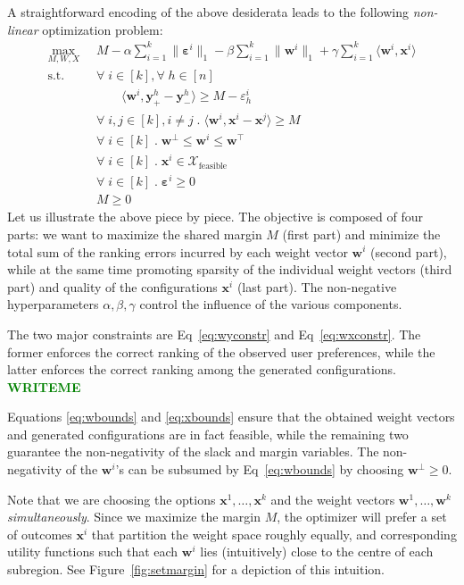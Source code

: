 \documentclass{article}
\renewcommand\[{\begin{equation}}
\renewcommand\]{\end{equation}}
\newcommand{\calvar}[1]{\ensuremath{\mathcal{#1}}}
\newcommand{\calX}{\calvar{X}}
\newcommand{\vecvar}[1]{\ensuremath{\boldsymbol{#1}}}
\newcommand{\vw}{\vecvar{w}}
\newcommand{\vx}{\vecvar{x}}
\newcommand{\vy}{\vecvar{y}}
\newcommand{\veps}{\vecvar{\varepsilon}}
\newcommand{\stefano}[1]{{\bf \textcolor{green}{{\fbox{Stefano:} #1}}}}
\begin{document}
A straightforward encoding of the above desiderata leads to the following {\em
non-linear} optimization problem:
%
{\footnotesize
\begin{align}
    \max_{M, W, X}
        & \;\; M - \alpha \sum_{i=1}^k \| \veps^{i} \|_1 - \beta \sum_{i=1}^k \| \vw^{i} \|_1 + \gamma \sum_{i=1}^k \langle \vw^{i}, \vx^{i} \rangle
        \nonumber
    \\
    \text{s.t.}
        & \;\; \forall \; i \in [k], \forall \; h \in [n] \nonumber
    \\
        & \;\; \qquad \langle \vw^{i}, \vy^{h}_+ - \vy^{h}_- \rangle \ge M - \varepsilon^{i}_h \label{eq:wyconstr}
    \\
        & \;\; \forall \; i, j \in [k], i \neq j \;.\; \langle \vw^{i}, \vx^{i} - \vx^{j} \rangle \ge M \label{eq:wxconstr}
    \\
        & \;\; \forall \; i \in [k] \;.\; \vw^\bot \le \vw^{i} \le \vw^\top \label{eq:wbounds}
    \\
        & \;\; \forall \; i \in [k] \;.\; \vx^{i} \in \calX_{\text{feasible}} \label{eq:xbounds}
    \\
        & \;\; \forall \; i \in [k] \;.\; \veps^{i} \ge 0 \nonumber
    \\
        & \;\; M \ge 0 \nonumber
\end{align}
}
%
Let us illustrate the above piece by piece. The objective is composed of four
parts: we want to maximize the shared margin $M$ (first part) and minimize the
total sum of the ranking errors incurred by each weight vector $\vw^{i}$
(second part), while at the same time promoting sparsity of the individual
weight vectors (third part) and quality of the configurations $\vx^{i}$ (last
part). The non-negative hyperparameters $\alpha,\beta,\gamma$ control the
influence of the various components.

The two major constraints are Eq~\ref{eq:wyconstr} and Eq~\ref{eq:wxconstr}.
The former enforces the correct ranking of the observed user preferences, while
the latter enforces the correct ranking among the generated configurations.
\stefano{WRITEME}

Equations \ref{eq:wbounds} and \ref{eq:xbounds} ensure that the obtained weight
vectors and generated configurations are in fact feasible, while the remaining
two guarantee the non-negativity of the slack and margin variables.  The
non-negativity of the $\vw^{i}$'s can be subsumed by Eq~\ref{eq:wbounds}
by choosing $\vw^\bot \ge 0$.

Note that we are choosing the options $\vx^{1}, \ldots, \vx^{k}$ and the
weight vectors $\vw^{1}, \ldots, \vw^{k}$ {\em simultaneously}. Since we
maximize the margin $M$, the optimizer will prefer a set of outcomes
$\vx^{i}$ that partition the weight space roughly equally, and corresponding
utility functions such that each $\vw^{i}$ lies (intuitively) close to the
centre of each subregion. See Figure~\ref{fig:setmargin} for a depiction of
this intuition.
\end{document}
